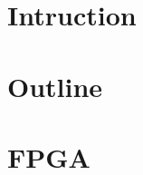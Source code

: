 \documentclass{paper}
\title{}
\author{Viktor Horsmanheimo}
\date{\today}
\begin{document}
\maketitle

\tableofcontents

\section{Intruction}
\section{Outline}
\section{FPGA}

\printbibliography
\end{document}
